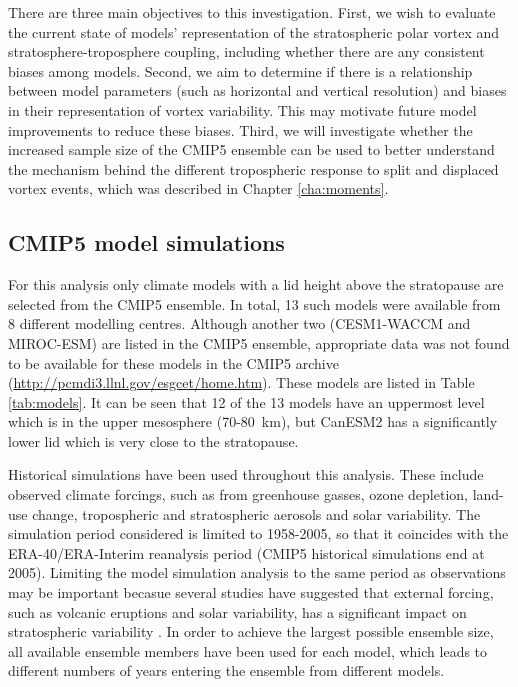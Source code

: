 There are three main objectives to this investigation. First, we wish to
evaluate the current state of models' representation of the stratospheric polar
vortex and stratosphere-troposphere coupling, including whether there are any
consistent biases among models. Second, we aim to determine if there is a
relationship between model parameters (such as horizontal and vertical
resolution) and biases in their representation of vortex variability. This may
motivate future model improvements to reduce these biases. Third, we will
investigate whether the increased sample size of the CMIP5 ensemble can be used
to better understand the mechanism behind the different tropospheric response to
split and displaced vortex events, which was described in Chapter
\ref{cha:moments}.

\subsection{CMIP5 model simulations}

For this analysis only climate models with a lid height above the stratopause
are selected from the CMIP5 ensemble. In total, 13 such models were available
from 8 different modelling centres. Although another two (CESM1-WACCM and
MIROC-ESM) are listed in the CMIP5 ensemble, appropriate data was not found to
be available for these models in the CMIP5 archive
(\url{http://pcmdi3.llnl.gov/esgcet/home.htm}). These models are listed in Table
\ref{tab:models}. It can be seen that 12 of the 13 models have an uppermost
level which is in the upper mesosphere (70-80~km), but CanESM2 has a
significantly lower lid which is very close to the stratopause.

Historical simulations have been used throughout this analysis. These include
observed climate forcings, such as from greenhouse gasses, ozone depletion,
land-use change, tropospheric and stratospheric aerosols and solar
variability. The simulation period considered is limited to 1958-2005, so that
it coincides with the ERA-40/ERA-Interim reanalysis period (CMIP5 historical
simulations end at 2005). Limiting the model simulation analysis to the same
period as observations may be important becasue several studies have suggested
that external forcing, such as volcanic eruptions and solar variability, has a
significant impact on stratospheric variability
\citep[e.g.,][]{Kodera1994,Gray2010,Mitchell2011a}. In order to achieve the
largest possible ensemble size, all available ensemble members have been used
for each model, which leads to different numbers of years entering the ensemble
from different models.

